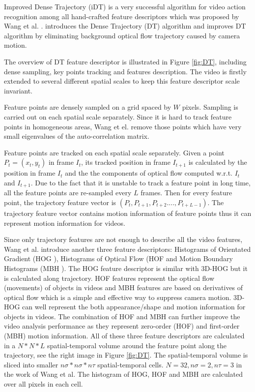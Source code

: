 Improved Dense Trajectory (iDT) is a very successful algorithm for video action recognition among all hand-crafted feature descriptors which was proposed by Wang et al. \cite{wang2012} \cite{wang2013}.  \cite{wang2012} introduces the Dense Trajectory (DT) algorithm and \cite{wang2013} improves DT algorithm by eliminating background optical flow trajectory caused by camera motion.
\par
The overview of DT feature descriptor is illustrated in Figure \ref{fig:DT}, including dense sampling, key points tracking and features description. The video is firstly extended to several different spatial scales to keep this feature descriptor scale invariant.
\par 
Feature points are densely sampled on a grid spaced by \(W\) pixels. Sampling is carried out on each spatial scale separately. Since it is hard to track feature points in homogeneous areas, Wang et el. remove those points which have very small eigenvalues of the auto-correlation matrix. 
\par 
Feature points are tracked on each spatial scale separately. Given a point \(P_t = (x_t,y_t)\) in frame \(I_t\), its tracked position in frame \(I_{t+1}\) is calculated by the position in frame \(I_t\) and the the components of optical flow computed  w.r.t. \(I_t\) and \(I_{t+1}\). Due to the fact that it is unstable to track a feature point in long time, all the feature points are re-sampled every \(L\) frames. Then for every feature point, the trajectory feature vector is \((P_t,P_{t+1},P_{t+2}....,P_{t+L-1})\). The trajectory feature vector contains motion information of feature points thus it can represent motion information for videos. 
\par 
Since only trajectory features are not enough to describe all the video features, Wang et al. introduce another three feature descriptors: Histograms of Orientated Gradient (HOG \cite{hog}), Histograms of Optical Flow (HOF \cite{hof} and Motion Boundary Histograms (MBH \cite{hof}). The HOG feature descriptor is similar with 3D-HOG but it is calculated along trajectory. HOF features represent the optical flow (movements) of objects in videos and MBH features are based on derivatives of optical flow which is a simple and effective way to suppress camera motion. 3D-HOG can well represent the both appearance/shape and motion information for objects in videos. The combination of HOF and MBH can further improve the video analysis performance as they represent zero-order (HOF) and first-order (MBH) motion information. All of these three feature descriptors are calculated in a \(N*N*L\) spatial-temporal volume around the feature point along the trajectory, see the right image in Figure \ref{fig:DT}. The spatial-temporal volume is sliced into smaller \(n\sigma * n\sigma * n\tau \) spatial-temporal cells. \(N= 32, n\sigma = 2, n\tau = 3 \) in the work of Wang et al. The histogram of HOG, HOF and MBH are calculated over all pixels in each cell.

